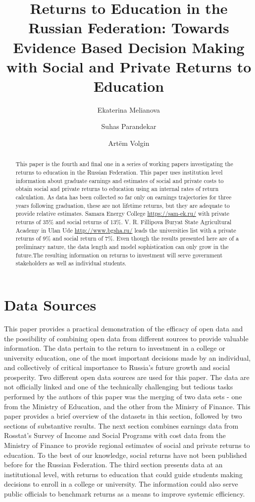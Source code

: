 \documentclass[alpha-refs]{wiley-article-05g}
\title{Returns to Education in the Russian Federation: Towards Evidence Based Decision Making with Social and Private Returns to Education}
\author[*]{Ekaterina Melianova}
\author[*]{\hspace{-1em}Suhas Parandekar}
\author[*]{\hspace{-1em}Art\"{e}m Volgin}
\affil[*]{Education Global Practice, Europe and Central Asia}
\begin{document}
\maketitle

\begin{abstract}
\vspace{.5em}
This paper is the fourth and final one in a series of working papers investigating the returns to education in the Russian Federation. This paper uses institution level information about graduate earnings and estimates of social and private costs to obtain social and private returns to education using an internal rates of return calculation. As data has been collected so far only on earnings trajectories for three years following graduation, these are not lifetime returns, but they are adequate to provide relative estimates. Samara Energy College \url{https://sam-ek.ru/} with private returns of 35\% and social returns of 13\%. V. R. Fillipova Buryat State Agricultural Academy in Ulan Ude \url{http://www.bgsha.ru/} leads the universities list with a private returns of 9\% and social return of 7\%. Even though the results presented here are of a preliminary nature, the data length and model sophistication can only grow in the future.The resulting information on returns to investment will serve government stakeholders as well as individual students.  

\end{abstract}

\section{Data Sources}

This paper provides a practical demonstration of the efficacy of open data and the possibility of combining open data from different sources to provide valuable information. The data pertain to the return to investment in a college or university education, one of the most important decisions made by an individual, and collectively of critical importance to Russia's future growth and social prosperity. Two different open data sources are used for this paper. The data are not officially linked and one of the technically challenging but tedious tasks performed by the authors of this paper was the merging of two data sets - one from the Ministry of Education, and the other from the Minisry of Finance. This paper provides a brief overview of the datasets in this section, followed by two sections of substantive results. The next section combines earnings data from Rosstat's Survey of Income and Social Programs with cost data from the Ministry of Finance to provide regional estimates of social and private returns to education. To the best of our knowledge, social returns have not been published before for the Russian Federation. The third section presents data at an institutional level, with returns to education that could guide students making decisions to enroll in a college or university. The information could also serve public officials to benchmark returns as a means to improve systemic efficiency. 
\end{document}
